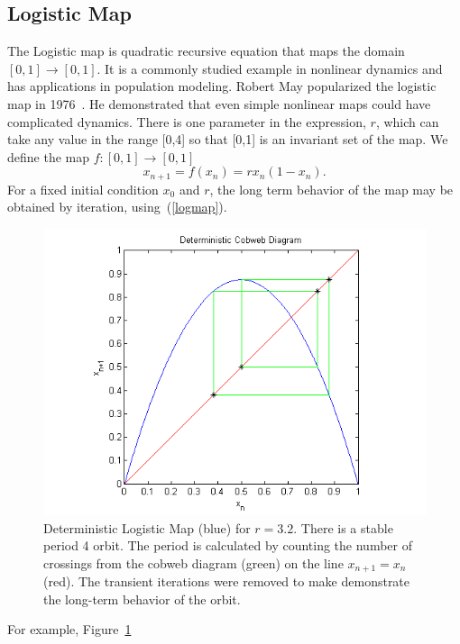 \subsection{Logistic Map}
The Logistic map is  quadratic recursive equation that maps the domain
$[0,1] \rightarrow [0,1]$. It is a commonly studied example in nonlinear dynamics and has
applications in population modeling. Robert May popularized the
logistic map in 1976~\cite{may}. He demonstrated that even simple nonlinear
maps could have complicated dynamics. There is one parameter in the
expression, $r$, which can take any value in the range [0,4] so that
[0,1] is an invariant set of the map. We define the map $f:[0,1]\to [0,1]$
\begin{equation}\label{logmap}
x_{n+1} = f(x_n) = rx_n(1-x_n).
\end{equation}
For a fixed initial condition $x_0$ and $r$, the long term behavior of
the map may be obtained by iteration, using~(\ref{logmap}). 
\begin{figure}[!h]
\caption[Deterministic logistic map, stable orbit]{Deterministic
  Logistic Map (blue) for $r=3.2$. There is a stable period 4
  orbit. The period is calculated by counting the number of crossings
  from the cobweb diagram (green) on the line $x_{n+1}=x_n$ (red). The
  transient iterations were removed to make demonstrate the long-term
  behavior of the orbit.}\label{fig:detlogstable}
    \begin{center}
	\includegraphics[scale=0.75]{figs/det_cobweb.png}
    \end{center}
\end{figure}
For example, Figure~\ref{fig:detlogstable}
